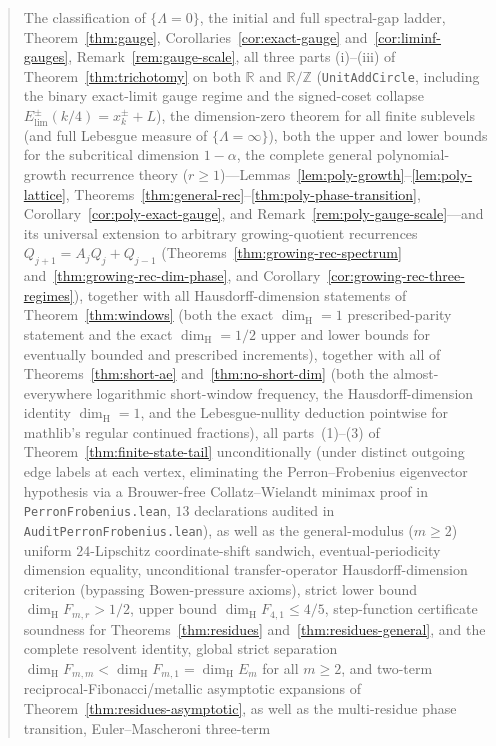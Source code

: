\documentclass[11pt]{article}
\theoremstyle{definition}
\theoremstyle{remark}
\newcommand{\R}{\mathbb{R}}
\newcommand{\Z}{\mathbb{Z}}
\newcommand{\dimH}{\dim_{\mathrm{H}}}
\newcommand{\Lam}{\Lambda}
\begin{document}
\begin{abstract}
The classification of $\{\Lam=0\}$, the initial and full spectral-gap ladder,
Theorem~\ref{thm:gauge},
Corollaries~\ref{cor:exact-gauge} and~\ref{cor:liminf-gauges},
Remark~\ref{rem:gauge-scale}, all three parts (i)--(iii) of
Theorem~\ref{thm:trichotomy} on both $\R$ and $\R/\Z$ (\texttt{UnitAddCircle},
including the binary exact-limit gauge regime and the signed-coset collapse
$E_{\mathrm{lim}}^\pm(k/4)=x_k^\pm+L$), the dimension-zero theorem for all
finite sublevels (and full Lebesgue measure of $\{\Lam=\infty\}$), both the upper
and lower bounds for the subcritical dimension $1-\alpha$, the complete
general polynomial-growth recurrence theory ($r\ge1$)---Lemmas~\ref{lem:poly-growth}--\ref{lem:poly-lattice},
Theorems~\ref{thm:general-rec}--\ref{thm:poly-phase-transition},
Corollary~\ref{cor:poly-exact-gauge}, and Remark~\ref{rem:poly-gauge-scale}---and
its universal extension to arbitrary growing-quotient recurrences
$Q_{j+1}=A_jQ_j+Q_{j-1}$ (Theorems~\ref{thm:growing-rec-spectrum}
and~\ref{thm:growing-rec-dim-phase}, and
Corollary~\ref{cor:growing-rec-three-regimes}), together
with all Hausdorff-dimension statements of Theorem~\ref{thm:windows} (both the
exact $\dimH=1$ prescribed-parity statement and the exact $\dimH=1/2$ upper and lower bounds for eventually bounded and prescribed
increments), together with all of Theorems~\ref{thm:short-ae} and~\ref{thm:no-short-dim}
(both the almost-everywhere logarithmic short-window frequency, the
Hausdorff-dimension identity $\dimH=1$, and the Lebesgue-nullity deduction
pointwise for mathlib's regular continued fractions), all parts~(1)--(3) of
Theorem~\ref{thm:finite-state-tail} unconditionally (under distinct outgoing edge
labels at each vertex, eliminating the Perron--Frobenius eigenvector hypothesis via
a Brouwer-free Collatz--Wielandt minimax proof in \texttt{PerronFrobenius.lean}, $13$
declarations audited in \texttt{AuditPerronFrobenius.lean}), as well as the
general-modulus ($m\ge2$) uniform $24$-Lipschitz coordinate-shift sandwich,
eventual-periodicity dimension equality, unconditional transfer-operator
Hausdorff-dimension criterion (bypassing Bowen-pressure axioms), strict lower bound
$\dimH F_{m,r}>1/2$, upper bound $\dimH F_{4,1}\le 4/5$, step-function certificate
soundness for Theorems~\ref{thm:residues} and~\ref{thm:residues-general}, and the
complete resolvent identity, global strict separation
$\dimH F_{m,m}<\dimH F_{m,1}=\dimH E_m$ for all $m\ge2$, and two-term
reciprocal-Fibonacci/metallic asymptotic expansions of Theorem~\ref{thm:residues-asymptotic},
as well as the multi-residue phase transition, Euler--Mascheroni three-term

\end{abstract}
\end{document}
